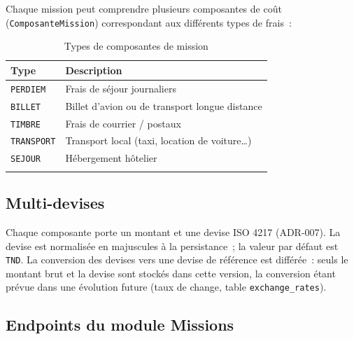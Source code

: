 Chaque mission peut comprendre plusieurs composantes de coût (\texttt{ComposanteMission})
correspondant aux différents types de frais~:

\begin{longtable}{|m{3.5cm}|m{11cm}|}
\hline
\textbf{Type} & \textbf{Description} \\
\hline
\endhead
\endfoot
\endlastfoot
\hline
\texttt{PERDIEM} & Frais de séjour journaliers \\
\hline
\texttt{BILLET} & Billet d'avion ou de transport longue distance \\
\hline
\texttt{TIMBRE} & Frais de courrier / postaux \\
\hline
\texttt{TRANSPORT} & Transport local (taxi, location de voiture…) \\
\hline
\texttt{SEJOUR} & Hébergement hôtelier \\
\hline
\caption{Types de composantes de mission}
\label{tab:mission-types}
\end{longtable}

\subsection{Multi-devises}

Chaque composante porte un montant et une devise ISO 4217 (ADR-007). La devise est normalisée en
majuscules à la persistance~; la valeur par défaut est \texttt{TND}. La conversion des devises vers
une devise de référence est différée~: seuls le montant brut et la devise sont stockés dans cette
version, la conversion étant prévue dans une évolution future (taux de change, table
\texttt{exchange\_rates}).

\subsection{Endpoints du module Missions}

